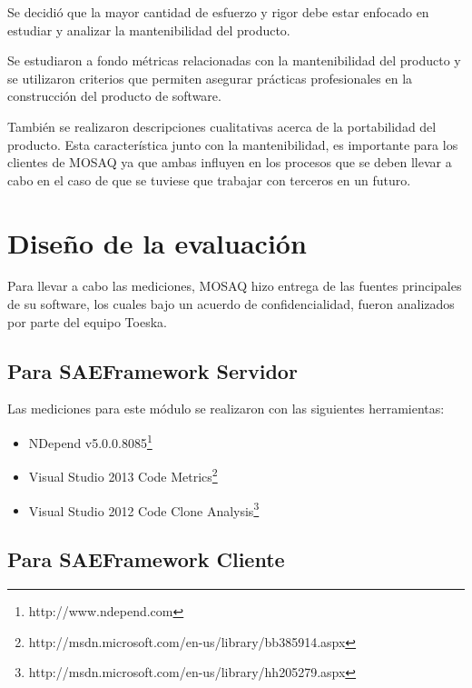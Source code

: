 Se decidió que la mayor cantidad de esfuerzo y rigor debe estar enfocado en estudiar y
analizar la mantenibilidad del producto.

Se estudiaron a fondo métricas relacionadas con la mantenibilidad del producto y se
utilizaron criterios que permiten asegurar prácticas profesionales en la construcción
del producto de software.

También se realizaron descripciones cualitativas acerca de la portabilidad del producto.
Esta característica junto con la mantenibilidad, es importante para los clientes de MOSAQ
ya que ambas influyen en los procesos que se deben llevar a cabo en el caso de que se tuviese
que trabajar con terceros en un futuro.
\label{chap:validation}

\section{Diseño de la evaluación}
Para llevar a cabo las mediciones, MOSAQ hizo entrega de las fuentes principales de su software,
los cuales bajo un acuerdo de confidencialidad, fueron analizados por parte del equipo Toeska.

\subsection{Para SAEFramework Servidor}
Las mediciones para este módulo se realizaron con las siguientes herramientas:

\begin{itemize}
\item NDepend v5.0.0.8085\footnote{http://www.ndepend.com}
\item Visual Studio 2013 Code Metrics\footnote{http://msdn.microsoft.com/en-us/library/bb385914.aspx}
\item Visual Studio 2012 Code Clone Analysis\footnote{http://msdn.microsoft.com/en-us/library/hh205279.aspx}
\end{itemize}

\subsection{Para SAEFramework Cliente}

